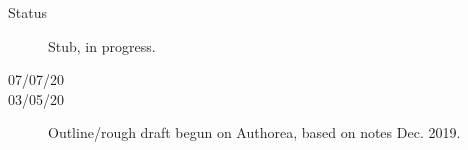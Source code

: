 \begin{description}
\item [{Status}] Stub, in progress.
\item [{07/07/20}] 
\item [{03/05/20}] Outline/rough draft begun on Authorea, based on notes Dec. 2019.
\end{description}